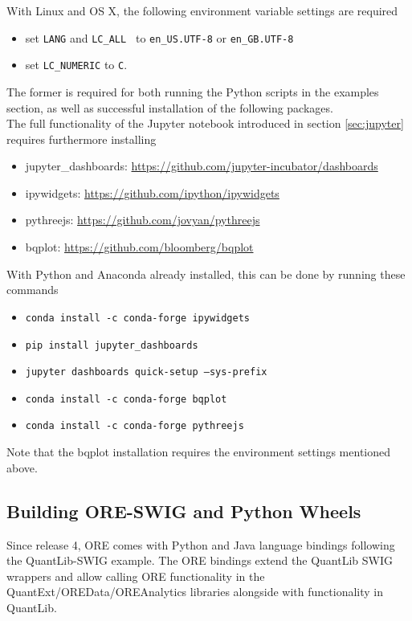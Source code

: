 \documentclass[12pt, a4paper]{article}
\begin{document}
With Linux and OS X, the following environment variable settings are required
\begin{itemize}
\item set {\tt LANG} and {\tt LC\_ALL } to {\tt en\_US.UTF-8} or {\tt en\_GB.UTF-8}
\item set {\tt LC\_NUMERIC} to {\tt C}. 
\end{itemize}
The former is required for both running the Python scripts in the examples section, as well as successful installation
of the following packages. \\

The full functionality of the Jupyter notebook introduced in section \ref{sec:jupyter} requires furthermore installing
\begin{itemize}
\item jupyter\_dashboards: \url{https://github.com/jupyter-incubator/dashboards}
\item ipywidgets: \url{https://github.com/ipython/ipywidgets}
\item pythreejs: \url{https://github.com/jovyan/pythreejs}
\item bqplot: \url{https://github.com/bloomberg/bqplot}
\end{itemize}
With Python and Anaconda already installed, this can be done by running these commands
\begin{itemize}
\item {\tt conda install -c conda-forge ipywidgets}
\item {\tt pip install jupyter\_dashboards}
\item {\tt jupyter dashboards quick-setup --sys-prefix}
\item {\tt conda install -c conda-forge bqplot}
\item {\tt conda install -c conda-forge pythreejs}
\end{itemize}
Note that the bqplot installation requires the environment settings mentioned above.

\subsection{Building ORE-SWIG and Python Wheels}\label{sec:oreswig}

Since release 4, ORE comes with Python and Java language bindings following the QuantLib-SWIG example.
The ORE bindings extend the QuantLib SWIG wrappers and allow calling ORE functionality in the 
QuantExt/OREData/OREAnalytics libraries alongside with functionality in QuantLib.  
\end{document}
